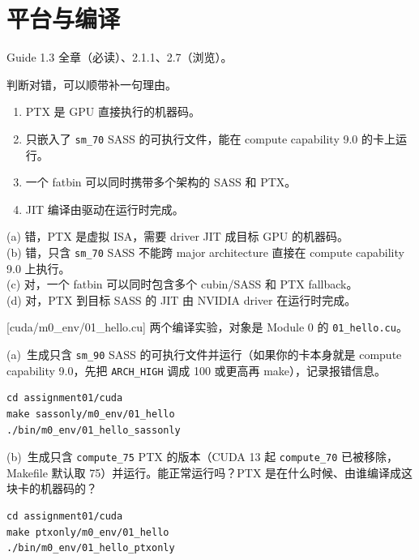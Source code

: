 \documentclass[11pt,a4paper,fontset=fandol]{ctexart}
\begin{document}
\section{平台与编译}

\begin{reading}
Guide 1.3 全章（必读）、2.1.1、2.7（浏览）。
\end{reading}

判断对错，可以顺带补一句理由。
\begin{enumerate}[label=(\alph*)]
  \item PTX 是 GPU 直接执行的机器码。
  \item 只嵌入了 \texttt{sm\_70} SASS 的可执行文件，能在 compute capability 9.0 的卡上运行。
  \item 一个 fatbin 可以同时携带多个架构的 SASS 和 PTX。
  \item JIT 编译由驱动在运行时完成。
\end{enumerate}

\begin{answer}
(a) 错，PTX 是虚拟 ISA，需要 driver JIT 成目标 GPU 的机器码。\\
(b) 错，只含 \texttt{sm\_70} SASS 不能跨 major architecture 直接在
compute capability 9.0 上执行。\\
(c) 对，一个 fatbin 可以同时包含多个 cubin/SASS 和 PTX fallback。\\
(d) 对，PTX 到目标 SASS 的 JIT 由 NVIDIA driver 在运行时完成。
\end{answer}

[cuda/m0\_env/01\_hello.cu]
两个编译实验，对象是 Module 0 的 \texttt{01\_hello.cu}。

(a)~生成只含 \texttt{sm\_90} SASS 的可执行文件并运行（如果你的卡本身就是 compute capability 9.0，先把 \texttt{ARCH\_HIGH} 调成 100 或更高再 make），记录报错信息。

\begin{lstlisting}
cd assignment01/cuda
make sassonly/m0_env/01_hello
./bin/m0_env/01_hello_sassonly
\end{lstlisting}

(b)~生成只含 \texttt{compute\_75} PTX 的版本（CUDA 13 起 \texttt{compute\_70} 已被移除，Makefile 默认取 75）并运行。能正常运行吗？PTX 是在什么时候、由谁编译成这块卡的机器码的？

\begin{lstlisting}
cd assignment01/cuda
make ptxonly/m0_env/01_hello
./bin/m0_env/01_hello_ptxonly
\end{lstlisting}
\end{document}
